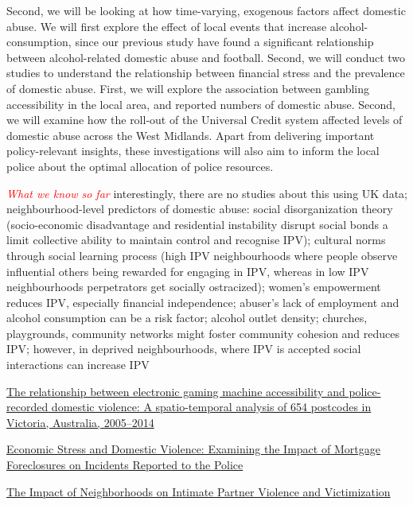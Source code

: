 \documentclass[11pt, a4paper]{article}
\begin{document}
Second, we will be looking at how time-varying, exogenous factors affect domestic abuse. We will first explore the effect of local events that increase alcohol-consumption, since our previous study have found a significant relationship between alcohol-related domestic abuse and football. Second, we will conduct two studies to understand the relationship between financial stress and the prevalence of domestic abuse. First, we will explore the association between gambling accessibility in the local area, and reported numbers of domestic abuse. Second, we will examine how the roll-out of the Universal Credit system affected levels of domestic abuse across the West Midlands. Apart from delivering important policy-relevant insights, these investigations will also aim to inform the local police about the optimal allocation of police resources. 



\textcolor{red}{\textit{What we know so far}} interestingly, there are no studies about this using UK data; neighbourhood-level predictors of domestic abuse: social disorganization theory (socio-economic disadvantage and residential instability disrupt social bonds a limit collective ability to maintain control and recognise IPV); cultural norms through social learning process (high IPV neighbourhoods where people observe influential others being rewarded for engaging in IPV, whereas in low IPV neighbourhoods perpetrators get socially ostracized); women's empowerment reduces IPV, especially financial independence;  abuser's lack of employment and alcohol consumption can be a risk factor; alcohol outlet density; churches, playgrounds, community networks might foster community cohesion and reduces IPV;  however, in deprived neighbourhoods, where IPV is accepted social interactions can increase IPV

\href{https://www.sciencedirect.com/science/article/abs/pii/S0277953616302891}{The relationship between electronic gaming machine accessibility and police-recorded domestic violence: A spatio-temporal analysis of 654 postcodes in Victoria, Australia, 2005–2014}

\href{https://journals.sagepub.com/doi/abs/10.1177/1525107115623938}{Economic Stress and Domestic Violence: Examining the Impact of Mortgage Foreclosures on Incidents Reported to the Police }

\href{https://journals.sagepub.com/doi/abs/10.1177/1524838012445641?journalCode=tvaa}{
The Impact of Neighborhoods on Intimate Partner Violence and Victimization
}
\end{document}
